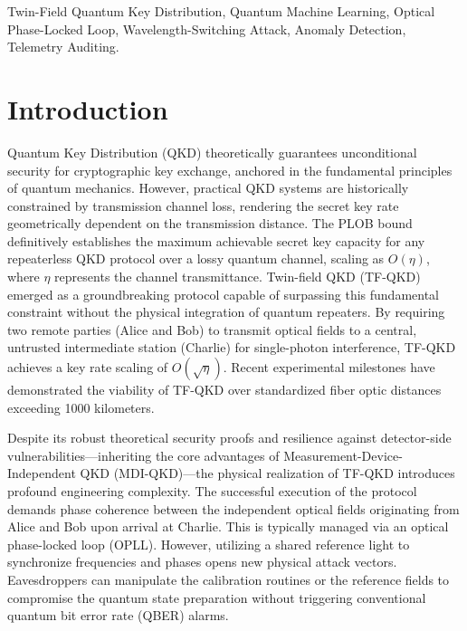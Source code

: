 \documentclass[conference]{IEEEtran}
\begin{document}
\begin{IEEEkeywords}
Twin-Field Quantum Key Distribution, Quantum Machine Learning, Optical Phase-Locked Loop, Wavelength-Switching Attack, Anomaly Detection, Telemetry Auditing.
\end{IEEEkeywords}

\section{Introduction}

Quantum Key Distribution (QKD) theoretically guarantees unconditional security for cryptographic key exchange, anchored in the fundamental principles of quantum mechanics. However, practical QKD systems are historically constrained by transmission channel loss, rendering the secret key rate geometrically dependent on the transmission distance. The PLOB bound definitively establishes the maximum achievable secret key capacity for any repeaterless QKD protocol over a lossy quantum channel, scaling as $O(\eta)$, where $\eta$ represents the channel transmittance. Twin-field QKD (TF-QKD) emerged as a groundbreaking protocol capable of surpassing this fundamental constraint without the physical integration of quantum repeaters. By requiring two remote parties (Alice and Bob) to transmit optical fields to a central, untrusted intermediate station (Charlie) for single-photon interference, TF-QKD achieves a key rate scaling of $O(\sqrt{\eta})$. Recent experimental milestones have demonstrated the viability of TF-QKD over standardized fiber optic distances exceeding 1000 kilometers.

Despite its robust theoretical security proofs and resilience against detector-side vulnerabilities---inheriting the core advantages of Measurement-Device-Independent QKD (MDI-QKD)---the physical realization of TF-QKD introduces profound engineering complexity. The successful execution of the protocol demands phase coherence between the independent optical fields originating from Alice and Bob upon arrival at Charlie. This is typically managed via an optical phase-locked loop (OPLL). However, utilizing a shared reference light to synchronize frequencies and phases opens new physical attack vectors. Eavesdroppers can manipulate the calibration routines or the reference fields to compromise the quantum state preparation without triggering conventional quantum bit error rate (QBER) alarms.
\end{document}
